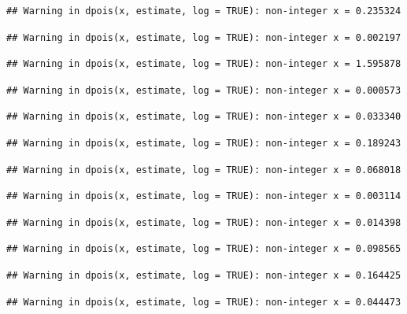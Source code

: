 \documentclass[]{article}
\begin{document}
\begin{verbatim}
## Warning in dpois(x, estimate, log = TRUE): non-integer x = 0.235324
\end{verbatim}

\begin{verbatim}
## Warning in dpois(x, estimate, log = TRUE): non-integer x = 0.002197
\end{verbatim}

\begin{verbatim}
## Warning in dpois(x, estimate, log = TRUE): non-integer x = 1.595878
\end{verbatim}

\begin{verbatim}
## Warning in dpois(x, estimate, log = TRUE): non-integer x = 0.000573
\end{verbatim}

\begin{verbatim}
## Warning in dpois(x, estimate, log = TRUE): non-integer x = 0.033340
\end{verbatim}

\begin{verbatim}
## Warning in dpois(x, estimate, log = TRUE): non-integer x = 0.189243
\end{verbatim}

\begin{verbatim}
## Warning in dpois(x, estimate, log = TRUE): non-integer x = 0.068018
\end{verbatim}

\begin{verbatim}
## Warning in dpois(x, estimate, log = TRUE): non-integer x = 0.003114
\end{verbatim}

\begin{verbatim}
## Warning in dpois(x, estimate, log = TRUE): non-integer x = 0.014398
\end{verbatim}

\begin{verbatim}
## Warning in dpois(x, estimate, log = TRUE): non-integer x = 0.098565
\end{verbatim}

\begin{verbatim}
## Warning in dpois(x, estimate, log = TRUE): non-integer x = 0.164425
\end{verbatim}

\begin{verbatim}
## Warning in dpois(x, estimate, log = TRUE): non-integer x = 0.044473
\end{verbatim}
\end{document}
